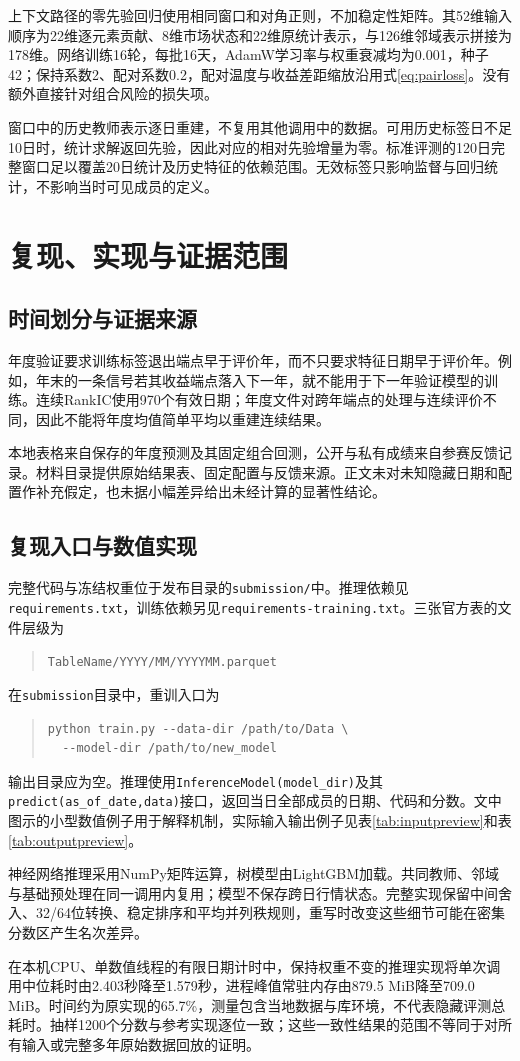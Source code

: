 \documentclass[UTF8,11pt,a4paper,fontset=fandol]{ctexart}
\begin{document}
上下文路径的零先验回归使用相同窗口和对角正则，不加稳定性矩阵。其52维输入顺序为22维逐元素贡献、8维市场状态和22维原统计表示，与126维邻域表示拼接为178维。网络训练16轮，每批16天，AdamW学习率与权重衰减均为0.001，种子42；保持系数2、配对系数0.2，配对温度与收益差距缩放沿用式\eqref{eq:pairloss}。没有额外直接针对组合风险的损失项。

窗口中的历史教师表示逐日重建，不复用其他调用中的数据。可用历史标签日不足10日时，统计求解返回先验，因此对应的相对先验增量为零。标准评测的120日完整窗口足以覆盖20日统计及历史特征的依赖范围。无效标签只影响监督与回归统计，不影响当时可见成员的定义。

\section{复现、实现与证据范围}\label{app:reproduce}
\subsection{时间划分与证据来源}
年度验证要求训练标签退出端点早于评价年，而不只要求特征日期早于评价年。例如，年末的一条信号若其收益端点落入下一年，就不能用于下一年验证模型的训练。连续RankIC使用970个有效日期；年度文件对跨年端点的处理与连续评价不同，因此不能将年度均值简单平均以重建连续结果。

本地表格来自保存的年度预测及其固定组合回测，公开与私有成绩来自参赛反馈记录。材料目录提供原始结果表、固定配置与反馈来源。正文未对未知隐藏日期和配置作补充假定，也未据小幅差异给出未经计算的显著性结论。

\subsection{复现入口与数值实现}
完整代码与冻结权重位于发布目录的\texttt{submission/}中。推理依赖见\texttt{requirements.txt}，训练依赖另见\texttt{requirements-training.txt}。三张官方表的文件层级为
\begin{quote}\small
\texttt{TableName/YYYY/MM/YYYYMM.parquet}
\end{quote}
在\texttt{submission}目录中，重训入口为
\begin{quote}\small
\begin{verbatim}
python train.py --data-dir /path/to/Data \
  --model-dir /path/to/new_model
\end{verbatim}
\end{quote}
输出目录应为空。推理使用\texttt{InferenceModel(model\_dir)}及其\texttt{predict(as\_of\_date,data)}接口，返回当日全部成员的日期、代码和分数。文中图示的小型数值例子用于解释机制，实际输入输出例子见表\ref{tab:inputpreview}和表\ref{tab:outputpreview}。

神经网络推理采用NumPy矩阵运算，树模型由LightGBM加载。共同教师、邻域与基础预处理在同一调用内复用；模型不保存跨日行情状态。完整实现保留中间舍入、32/64位转换、稳定排序和平均并列秩规则，重写时改变这些细节可能在密集分数区产生名次差异。

在本机CPU、单数值线程的有限日期计时中，保持权重不变的推理实现将单次调用中位耗时由2.403秒降至1.579秒，进程峰值常驻内存由879.5 MiB降至709.0 MiB。时间约为原实现的65.7\%，测量包含当地数据与库环境，不代表隐藏评测总耗时。抽样1200个分数与参考实现逐位一致；这些一致性结果的范围不等同于对所有输入或完整多年原始数据回放的证明。
\end{document}
